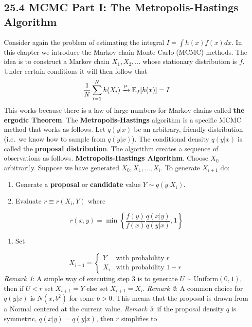 \subsection*{25.4 MCMC Part I: The Metropolis-Hastings
Algorithm}\label{mcmc-part-i-the-metropolis-hastings-algorithm}
Consider again the problem of estimating the integral
\(I = \int h(x) f(x) dx\). In this chapter we introduce the Markov chain
Monte Carlo (MCMC) methods. The idea is to construct a Markov chain
\(X_{1}, X_{2}, \dots\) whose stationary distribution is \(f\). Under
certain conditions it will then follow that
\[
\frac{1}{N} \sum_{i=1}^N h(X_{i}) \xrightarrow{\textrm{P}} \operatorname{\mathbb{E}}_f[h(x)] = I
\]
This works because there is a law of large numbers for Markov chains
called \textbf{the ergodic Theorem}.
The \textbf{Metropolis-Hastings} algorithm is a specific MCMC method
that works as follows. Let \(q(y | x)\) be an arbitrary, friendly
distribution (i.e.~we know how to sample from \(q(y | x)\)). The
conditional density \(q(y | x)\) is called the \textbf{proposal
distribution}. The algorithm creates a sequence of observations as
follows.
\textbf{Metropolis-Hastings Algorithm}.
Choose \(X_{0}\) arbitrarily. Suppose we have generated
\(X_{0}, X_{1}, \dots, X_{i}\). To generate \(X_{i+1}\) do:
\begin{enumerate}[tightlist,label={\arabic*.}]
\item
  Generate a \textbf{proposal} or \textbf{candidate} value
  \(Y \sim q(y | X_{i})\).
\item
  Evaluate \(r \equiv r(X_{i}, Y)\) where
\end{enumerate}
\[
r(x, y) = \min \left\{ \frac{f(y)}{f(x)} \frac{q(x | y)}{q(y | x)}, 1 \right\}
\]
\begin{enumerate}[tightlist,label={\arabic*.},resume]
\item
  Set
\end{enumerate}
\[
X_{i+1} = \begin{cases}
Y   &\text{with probability } r \\
X_{i} &\text{with probability } 1 - r 
\end{cases}
\]
\emph{Remark 1}: A simple way of executing step 3 is to generate
\(U \sim \text{Uniform}(0, 1)\), then if \(U < r\) set \(X_{i + 1} = Y\)
else set \(X_{i + 1} = X_{i}\).
\emph{Remark 2}: A common choice for \(q(y | x)\) is \(N(x, b^{2})\) for
some \(b > 0\). This means that the proposal is drawn from a Normal
centered at the current value.
\emph{Remark 3}: if the proposal density \(q\) is symmetric,
\(q(x | y) = q(y | x)\), then \(r\) simplifies to

